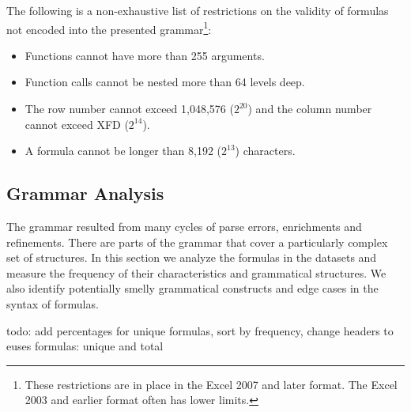 \documentclass[conference]{IEEEtran}
\begin{document}
The following is a non-exhaustive list of restrictions on the validity of formulas not encoded into the presented grammar\footnote{These restrictions are in place in the Excel 2007 and later format. The Excel 2003 and earlier format often has lower limits.}:

\begin{itemize}
	\item Functions cannot have more than 255 arguments.
	\item Function calls cannot be nested more than 64 levels deep.
	\item The row number cannot exceed 1,048,576 ($2^{20}$) and the column number cannot exceed XFD ($2^{14}$).
	\item A formula cannot be longer than 8,192 ($2^{13}$) characters.
\end{itemize}

\subsection{Grammar Analysis}
The grammar resulted from many cycles of parse errors, enrichments and refinements. There are parts of the grammar that cover a particularly complex set of structures. In this section we analyze the formulas in the datasets and measure the frequency of their characteristics and grammatical structures. We also identify potentially smelly grammatical constructs and edge cases in the syntax of formulas.

todo: add percentages for unique formulas, sort by frequency, change headers to euses formulas: unique and total
\end{document}
